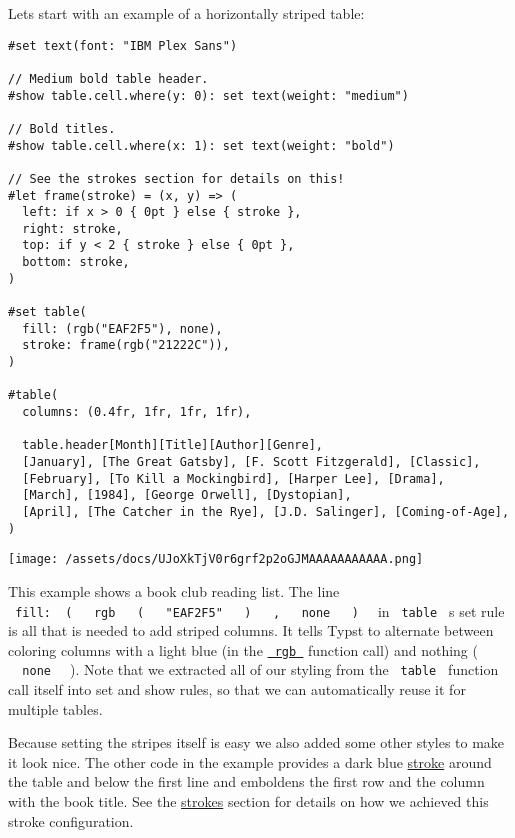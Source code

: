 Let\textquotesingle s start with an example of a horizontally striped
table:

\begin{verbatim}
#set text(font: "IBM Plex Sans")

// Medium bold table header.
#show table.cell.where(y: 0): set text(weight: "medium")

// Bold titles.
#show table.cell.where(x: 1): set text(weight: "bold")

// See the strokes section for details on this!
#let frame(stroke) = (x, y) => (
  left: if x > 0 { 0pt } else { stroke },
  right: stroke,
  top: if y < 2 { stroke } else { 0pt },
  bottom: stroke,
)

#set table(
  fill: (rgb("EAF2F5"), none),
  stroke: frame(rgb("21222C")),
)

#table(
  columns: (0.4fr, 1fr, 1fr, 1fr),

  table.header[Month][Title][Author][Genre],
  [January], [The Great Gatsby], [F. Scott Fitzgerald], [Classic],
  [February], [To Kill a Mockingbird], [Harper Lee], [Drama],
  [March], [1984], [George Orwell], [Dystopian],
  [April], [The Catcher in the Rye], [J.D. Salinger], [Coming-of-Age],
)
\end{verbatim}

\texttt{[image: /assets/docs/UJoXkTjV0r6grf2p2oGJMAAAAAAAAAAA.png]}

This example shows a book club reading list. The line
\texttt{\ fill:\ }{\texttt{\ (\ }}\texttt{\ }{\texttt{\ rgb\ }}\texttt{\ }{\texttt{\ (\ }}\texttt{\ }{\texttt{\ "EAF2F5"\ }}\texttt{\ }{\texttt{\ )\ }}\texttt{\ }{\texttt{\ ,\ }}\texttt{\ }{\texttt{\ none\ }}\texttt{\ }{\texttt{\ )\ }}\texttt{\ }
in \texttt{\ table\ } \textquotesingle s set rule is all that is needed
to add striped columns. It tells Typst to alternate between coloring
columns with a light blue (in the
\href{/docs/reference/visualize/color/\#definitions-rgb}{\texttt{\ rgb\ }}
function call) and nothing ( \texttt{\ }{\texttt{\ none\ }}\texttt{\ }
). Note that we extracted all of our styling from the \texttt{\ table\ }
function call itself into set and show rules, so that we can
automatically reuse it for multiple tables.

Because setting the stripes itself is easy we also added some other
styles to make it look nice. The other code in the example provides a
dark blue \hyperref[stroke-functions]{stroke} around the table and below
the first line and emboldens the first row and the column with the book
title. See the \hyperref[strokes]{strokes} section for details on how we
achieved this stroke configuration.

